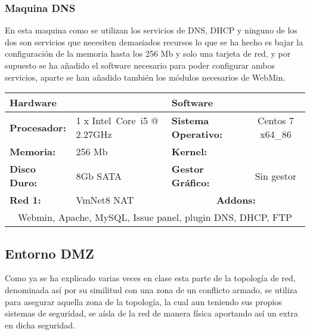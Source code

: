 \subsubsection{Maquina DNS}
En esta maquina como se utilizan los servicios de DNS, DHCP y ninguno de los dos son servicios que necesiten demasiados recursos lo que se ha hecho es bajar la configuración de la memoria hasta los 256 Mb y solo una tarjeta de red, y por supuesto se ha añadido el software necesario para poder configurar ambos servicios, aparte se han añadido también los módulos necesarios de WebMin.\\
\begin{tabular}{|l|l|l|c|}
	\hline \multicolumn{2}{|l|}{\textbf{Hardware}} & \multicolumn{2}{l|}{\textbf{Software}} \\ 
	\hline \textbf{Procesador:} & 1 x Intel\textregistered~Core\texttrademark~i5 @ 2.27GHz & \textbf{Sistema Operativo:} & Centos 7 x64\_86 \\ 
	\hline \textbf{Memoria:} & 256 Mb & \textbf{Kernel:} &  \\ 
	\hline \textbf{Disco Duro:} & 8Gb SATA & \textbf{Gestor Gráfico:} & Sin gestor \\ 
	\hline \textbf{Red 1:} & VmNet8 NAT  & \multicolumn{2}{c|}{\textbf{Addons:}} \\ 
	\hline \multicolumn{4}{|c|}{Webmin, Apache, MySQL, Issue panel, plugin DNS, DHCP, FTP} \\ 
	\hline 
\end{tabular} 

\subsection{Entorno DMZ}
Como ya se ha explicado varias veces en clase esta parte de la topología de red, denominada así por su similitud con una zona de un conflicto armado, se utiliza para asegurar aquella zona de la topología, la cual aun teniendo sus propios sistemas de seguridad, se aísla de la red de manera física aportando así un extra en dicha seguridad.\\

